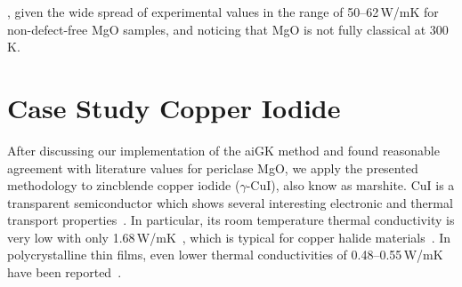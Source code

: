 , given the wide spread of experimental values in the range of 50--62\,W/mK for non-defect-free MgO samples, and noticing that MgO is not fully classical at 300\,K.

\section{Case Study Copper Iodide}

After discussing our implementation of the aiGK method and found reasonable agreement with literature values for periclase MgO, we apply the presented methodology to zincblende copper iodide ($\gamma$-CuI), also know as marshite. CuI is a transparent semiconductor which shows several interesting electronic and thermal transport properties~. In particular, its room temperature thermal conductivity is very low with only 1.68\,W/mK~, which is typical for copper halide materials~. In polycrystalline thin films, even lower thermal conductivities of 0.48--0.55\,W/mK have been reported~\cite{yang2017,coroa2019}.

